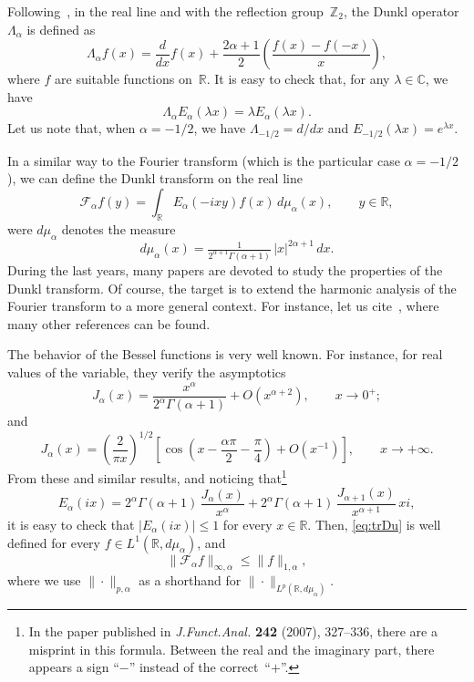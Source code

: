 \documentclass[a4paper]{amsart}
\theoremstyle{plain}
\theoremstyle{remark}
\newcommand{\R}{\mathbb{R}}
\newcommand{\Z}{\mathbb{Z}}
\newcommand{\C}{\mathbb{C}}
\newcommand{\Fa}{\mathcal{F}_\alpha} %
\newcommand{\mua}{\mu_\alpha}
\newcommand{\pa}{{p,\alpha}}
\begin{document}
Following~\cite{Du}, in the real line and with the reflection group~$\Z_2$, the Dunkl operator $\Lambda_\alpha$ is defined as
\begin{equation}
\label{eq:Duop}
  \Lambda_\alpha f(x) = \frac{d}{dx}f(x) + \frac{2\alpha+1}{2}
  \left(\frac{f(x)-f(-x)}{x}\right),
\end{equation}
where $f$ are suitable functions on~$\R$.
It is easy to check that, for any $\lambda \in \C$, we have
\begin{equation}
\label{eq:LDu}
  \Lambda_\alpha E_\alpha(\lambda x) = \lambda E_\alpha(\lambda x).
\end{equation}
Let us note that, when $\alpha = -1/2$, we have $\Lambda_{-1/2} = d/dx$ and $E_{-1/2}(\lambda x) = e^{\lambda x}$.

In a similar way to the Fourier transform (which is the particular case $\alpha = -1/2$), we can define the Dunkl transform on the real line
\begin{equation}
\label{eq:trDu}
  \Fa f(y)
  = \int_{\R} E_\alpha(-ixy)f(x)\,d\mua(x),
  \qquad y \in \R, 
\end{equation}
were $d\mua$ denotes the measure
$$
  d\mua(x) = \tfrac{1}{2^{\alpha+1}\Gamma(\alpha+1)}\, |x|^{2\alpha+1}\,dx.
$$
During the last years, many papers are devoted to study the properties of the Dunkl transform. Of course, the target is to extend the harmonic analysis of the Fourier transform to a more general context. For instance, let us cite~\cite{Jeu,Sol,Tr}, where many other references can be found.

The behavior of the Bessel functions is very well known. For instance, for real values of the variable, they verify the asymptotics
\begin{equation}
\label{eq:zero}
  J_\alpha(x) = \frac{x^\alpha}{2^\alpha \Gamma(\alpha+1)} + O(x^{\alpha+2}),
    \qquad x \to 0^+;
\end{equation}
and
\begin{equation}
\label{eq:infty}
  J_\alpha(x) = \left(\frac{2}{\pi x}\right)^{1/2}\left[ \cos\left(x-\frac{\alpha\pi}2
    - \frac\pi4 \right) + O(x^{-1}) \right], \qquad x \to +\infty.
\end{equation}
From these and similar results, and noticing that\footnote{In the paper published in \textit{J.\@ Funct.\@ Anal.\@} \textbf{242} (2007), 327--336, there are a misprint in this formula. Between the real and the imaginary part, there appears a sign ``$-$'' instead of the correct~``$+$''.}
\begin{equation}
\label{eq:Eix}
  E_\alpha(ix) = 2^\alpha \Gamma(\alpha+1) \, \frac{J_\alpha(x)}{x^\alpha}
  + 2^\alpha \Gamma(\alpha+1) \, \frac{J_{\alpha+1}(x)}{x^{\alpha+1}}\,xi,
\end{equation}
it is easy to check that $|E_\alpha(i x)| \le 1$ for every $x \in \R$. Then, \eqref{eq:trDu} is well defined for every $f \in L^1(\R,d\mua)$, and
$$
  \|\Fa f\|_{\infty,\alpha} \le \|f\|_{1,\alpha},
$$
where we use $\|\cdot\|_\pa$ as a shorthand for $\|\cdot\|_{L^p(\R,d\mua)}$.
\end{document}

